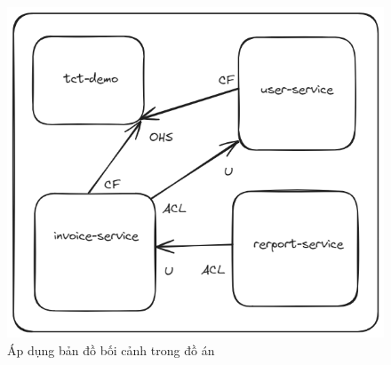 \begin{figure}[H]

    \centering

    \includegraphics[scale = 0.5]{pictures/_ap_dung_ban_do_boi_canh/freelancer.main.excalidraw.png}

    \caption{Áp dụng bản đồ bối cảnh trong đồ án}

\end{figure}